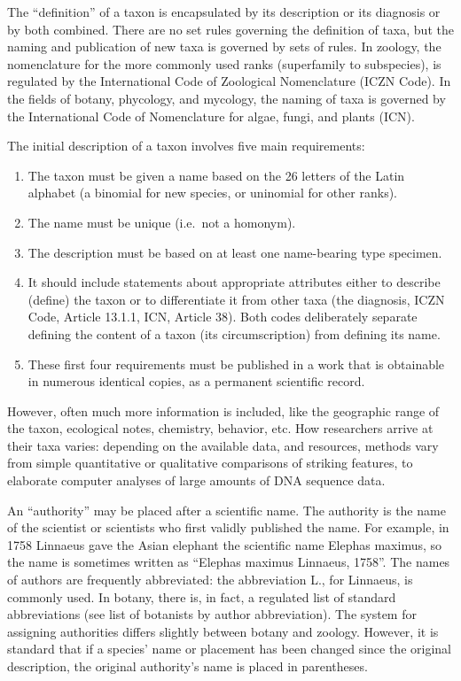 The ``definition'' of a taxon is encapsulated by its description or its diagnosis or by both combined. There are no set rules governing the definition of taxa, but the naming and publication of new taxa is governed by sets of rules. In zoology, the nomenclature for the more commonly used ranks (superfamily to subspecies), is regulated by the International Code of Zoological Nomenclature (ICZN Code). In the fields of botany, phycology, and mycology, the naming of taxa is governed by the International Code of Nomenclature for algae, fungi, and plants (ICN).

The initial description of a taxon involves five main requirements:

\begin{enumerate}
\def\labelenumi{\arabic{enumi}.}
\tightlist
\item
  The taxon must be given a name based on the 26 letters of the Latin alphabet (a binomial for new species, or uninomial for other ranks).
\item
  The name must be unique (i.e.~not a homonym).
\item
  The description must be based on at least one name-bearing type specimen.
\item
  It should include statements about appropriate attributes either to describe (define) the taxon or to differentiate it from other taxa (the diagnosis, ICZN Code, Article 13.1.1, ICN, Article 38). Both codes deliberately separate defining the content of a taxon (its circumscription) from defining its name.
\item
  These first four requirements must be published in a work that is obtainable in numerous identical copies, as a permanent scientific record.
\end{enumerate}

However, often much more information is included, like the geographic range of the taxon, ecological notes, chemistry, behavior, etc. How researchers arrive at their taxa varies: depending on the available data, and resources, methods vary from simple quantitative or qualitative comparisons of striking features, to elaborate computer analyses of large amounts of DNA sequence data.

An ``authority'' may be placed after a scientific name. The authority is the name of the scientist or scientists who first validly published the name. For example, in 1758 Linnaeus gave the Asian elephant the scientific name Elephas maximus, so the name is sometimes written as ``Elephas maximus Linnaeus, 1758''. The names of authors are frequently abbreviated: the abbreviation L., for Linnaeus, is commonly used. In botany, there is, in fact, a regulated list of standard abbreviations (see list of botanists by author abbreviation). The system for assigning authorities differs slightly between botany and zoology. However, it is standard that if a species' name or placement has been changed since the original description, the original authority's name is placed in parentheses.



